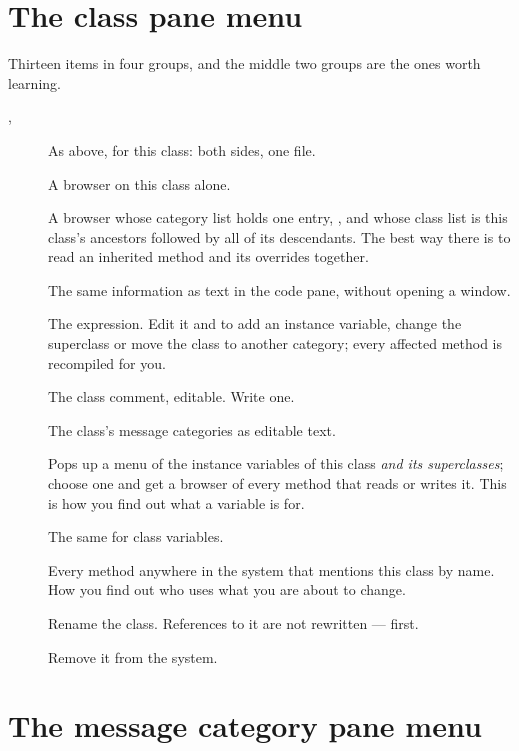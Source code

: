 \section{The class pane menu}

Thirteen items in four groups, and the middle two groups are the ones worth
learning.

\begin{description}
\item[, ] As above, for this class: both sides,
  one file.
\item[] A browser on this class alone.
\item[] A browser whose category list holds one entry,
  , and whose class list is this class's ancestors followed
  by all of its descendants. The best way there is to read an inherited method
  and its overrides together.
\medskip
\item[] The same information as text in the code pane, without
  opening a window.
\item[] The  expression. Edit it and
   to add an instance variable, change the superclass or move the
  class to another category; every affected method is recompiled for you.
\item[] The class comment, editable. Write one.
\item[] The class's message categories as editable text.
\medskip
\item[] Pops up a menu of the instance variables of this
  class \emph{and its superclasses}; choose one and get a browser of every
  method that reads or writes it. This is how you find out what a variable is
  for.
\item[] The same for class variables.
\item[] Every method anywhere in the system that mentions this
  class by name. How you find out who uses what you are about to change.
\medskip
\item[] Rename the class. References to it are not rewritten ---
   first.
\item[] Remove it from the system.
\end{description}

\section{The message category pane menu}

